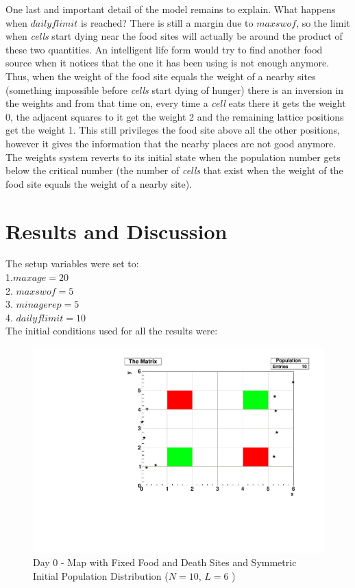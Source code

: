 \documentclass[a4paper,prd,twocolumn,nofootinbib,superscriptaddress,floatfix]{revtex4}
\begin{document}
One last and important detail of the model remains to explain. What happens when $dailyflimit$ is reached? There is still a margin due to $maxswof$, so the limit when \textit{cells} start dying near the food sites will actually be around the product of these two quantities. An intelligent life form would try to find another food source when it notices that the one it has been using is not enough anymore. Thus, when the weight of the food site equals the weight of a nearby sites (something impossible before \textit{cells} start dying of hunger) there is an inversion in the weights and from that time on, every time a \textit{cell} eats there it gets the weight 0, the adjacent squares to it get the weight 2 and the remaining lattice positions get the weight 1. This still privileges the food site above all the other positions, however it gives the information that the nearby places are not good anymore. \\
The weights system reverts to its initial state when the population number gets below the critical number (the number of \textit{cells} that exist when  the weight of the food site equals the weight of a nearby site).

 \section{Results and Discussion}
 The setup variables were set to:\\
1.$ maxage=20$\\
2. $maxswof=5$\\
3. $minagerep=5$\\
4. $dailyflimit=10$   \\
The initial conditions used for all the results were:\\


 \begin{figure}[H]
\centering
  \includegraphics[scale=0.4]{a_0.pdf}
\caption{Day 0 - Map with Fixed Food and Death Sites and Symmetric Initial Population Distribution ($N=10$, $L=6$ ) }
  \label{fig:4}
\end{figure}
\end{document}
